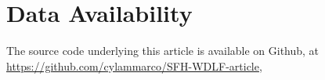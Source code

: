\documentclass[fleqn,usenatbib]{mnras}
\begin{document}
\section*{Data Availability}
The source code underlying this article is available on Github, at \url{https://github.com/cylammarco/SFH-WDLF-article}, 









\appendix

\end{document}
